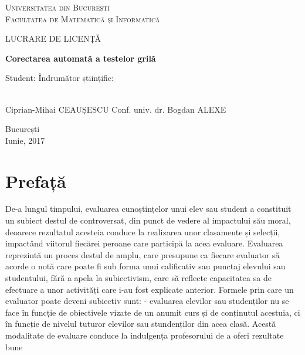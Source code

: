 \documentclass[a4paper,12pt]{report}
\newcommand\tab[1][1cm]{\hspace*{#1}}
\begin{document}
\begin{titlepage}
	\begin{center}
	\centering
	{\scshape\LARGE Universitatea din București\\Facultatea de Matematică și Informatică  \par}
	\vspace{3cm}
	{\Huge LUCRARE DE LICENȚĂ \par}
	\vspace{3cm}
	
	{\huge\bfseries Corectarea automată a testelor grilă\par}

	\vspace{8cm}
	\end{center}
	{\large \begin{itshape} Student: \tab \tab \tab \tab \tab \tab \tab \tab \tab Îndrumător științific:\end{itshape} 
	\\Ciprian-Mihai CEAUȘESCU \tab \tab \tab Conf. univ. dr. Bogdan ALEXE}
	\vfill
	\centering
	{\large București\\ Iunie, 2017}
\end{titlepage}

\tableofcontents{}

\chapter*{Prefață}
\tab De-a lungul timpului, evaluarea cunoștințelor unui elev sau student a constituit un subiect destul de controversat, din punct de vedere
al impactului său moral, deoarece rezultatul acesteia conduce la realizarea unor clasamente și selecții, impactând viitorul fiecărei peroane care
participă la acea evaluare. 
\newline\tab Evaluarea reprezintă un proces destul de amplu, care presupune ca fiecare evaluator să acorde o notă care poate fi sub forma unui calificativ
sau punctaj elevului sau studentului, fără a apela la subiectivism, care să reflecte capacitatea sa de efectuare a unor activități care i-au fost
explicate anterior.
\newline\tab Formele prin care un evaluator poate deveni subiectiv sunt:
\newline - evaluarea elevilor sau studenților nu se face în funcție de obiectivele vizate de un anumit curs și de conținutul acestuia, ci în funcție de nivelul 
tuturor elevilor sau stundenților din acea clasă. Acestă modalitate de evaluare conduce la indulgența profesorului de a oferi rezultate bune
\end{document}
